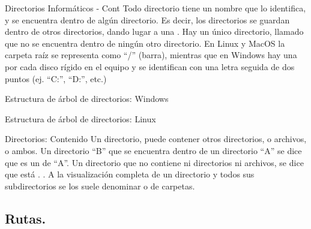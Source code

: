 
\begin{frame}{Directorios Informáticos - Cont}
  Todo directorio tiene un nombre que lo identifica, y se encuentra dentro de
  algún directorio.
  \jump
  Es decir, los directorios se guardan dentro de otros directorios, dando lugar
  a una .
  \jump
  Hay un único directorio, llamado  que no se encuentra dentro de
  ningún otro directorio. En Linux y MacOS la carpeta raíz se representa como
  ``/'' (barra), mientras que en Windows hay una por cada disco rígido en el
  equipo y se identifican con una letra seguida de dos puntos
  (ej. ``C:'', ``D:'', etc.)
\end{frame}


\begin{frame}{Estructura de árbol de directorios: Windows}
\end{frame}


\begin{frame}{Estructura de árbol de directorios: Linux}
\end{frame}


\begin{frame}{Directorios: Contenido}
  Un directorio, puede contener otros directorios, o archivos, o
  ambos.
  \jump
  Un directorio ``B'' que se encuentra dentro de un directorio ``A''
  se dice que es un  de ``A''.
  \jump
  Un directorio que no contiene ni directorios ni archivos, se dice que
  está .
  \jump
  .
  \jump
  A la visualización completa de un directorio y todos sus subdirectorios
  se los suele denominar  o  de carpetas.
\end{frame}


\subsection{Rutas.}

